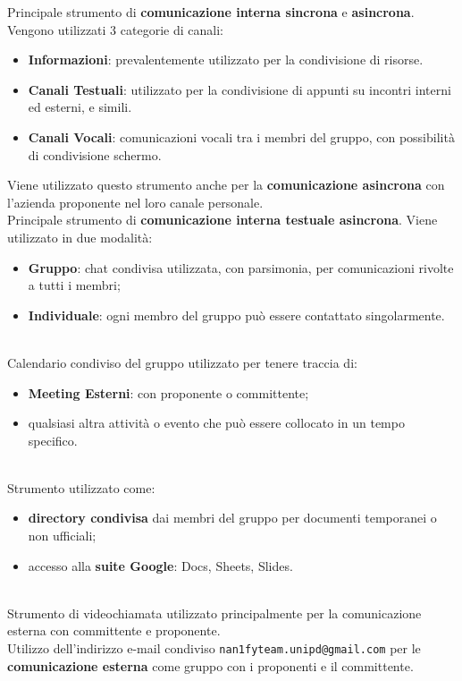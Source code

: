 Principale strumento di \textbf{comunicazione interna sincrona} e \textbf{asincrona}. Vengono utilizzati 3 categorie di canali:
\begin{itemize}
  \item \textbf{Informazioni}: prevalentemente utilizzato per la condivisione di risorse.
  \item \textbf{Canali Testuali}: utilizzato per la condivisione di appunti su incontri interni ed esterni, e simili.
  \item \textbf{Canali Vocali}: comunicazioni vocali tra i membri del gruppo, con possibilità di condivisione schermo.
\end{itemize}
\medskip
Viene utilizzato questo strumento anche per la \textbf{comunicazione asincrona} con l'azienda proponente nel loro canale personale.
\\
Principale strumento di \textbf{comunicazione interna testuale asincrona}. Viene utilizzato in due modalità:
\begin{itemize}
  \item \textbf{Gruppo}: chat condivisa utilizzata, con parsimonia, per comunicazioni rivolte a tutti i membri;
  \item \textbf{Individuale}: ogni membro del gruppo può essere contattato singolarmente.
\end{itemize}
\medskip
{}\\
Calendario condiviso del gruppo utilizzato per tenere traccia di:
\begin{itemize}
  \item \textbf{Meeting Esterni}: con proponente o committente;
  \item qualsiasi altra attività o evento che può essere collocato in un tempo specifico.
\end{itemize}
\\
Strumento utilizzato come:
\begin{itemize}
  \item \textbf{directory condivisa} dai membri del gruppo per documenti temporanei o non ufficiali;
  \item accesso alla \textbf{suite Google}: Docs, Sheets, Slides.
\end{itemize}
\\
Strumento di videochiamata utilizzato principalmente per la comunicazione esterna con committente e proponente.
\\
Utilizzo dell'indirizzo e-mail condiviso \texttt{nan1fyteam.unipd@gmail.com} per le \textbf{comunicazione esterna} come gruppo con i proponenti e il committente.

